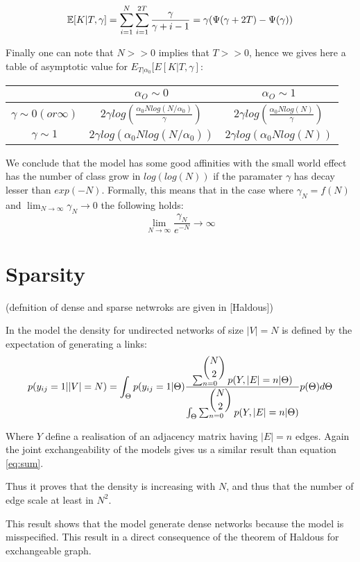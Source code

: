 \documentclass[a4paper, 12pt]{article}
\begin{document}
\begin{equation}
\mathbb{E}[K|T, \gamma] = \sum_{i=1}^N\sum_{i=1}^{2T} \frac{\gamma}{\gamma +i-1} = \gamma (\Psi(\gamma+2T) - \Psi(\gamma))
\end{equation}

Finally one can note that $N >> 0$ implies that $T>>0$, hence we gives here a table of asymptotic value for $E_{T|\alpha_0}[E[K|T, \gamma]$:

	\begin{tabular}{c|cc}
		 & $\alpha_O \sim 0$&$\alpha_O \sim 1$ \\
		\hline
		$\gamma \sim 0 (or \infty)$ & $2\gamma log(\frac{\alpha_0Nlog(N/\alpha_0)}{\gamma})$ & $2\gamma log(\frac{\alpha_0Nlog(N)}{\gamma})$ \\
		$\gamma \sim 1$ & $2\gamma log(\alpha_0Nlog(N/\alpha_0))$ &  $2\gamma log(\alpha_0Nlog(N))$
	\end{tabular}

We conclude that the model has some good affinities with the small world effect has the number of class grow in $log(log(N))$ if the paramater $\gamma$ has decay lesser than $exp(-N)$. Formally, this means that in the case where  $\gamma_N = f(N)$ and $\lim_{N\to\infty}\gamma_N \to 0$ the following holds:
$$\lim_{N\to\infty} \frac{\gamma_N}{e^{-N}} \to \infty$$


\section{Sparsity}
(defnition of dense and sparse netwroks are given in [Haldous])


In the model the density for undirected networks of size $|V|=N$ is defined by the expectation of generating a links:
\begin{equation}
p(y_{ij}=1| |V|=N) =  \int_{\Theta} p(y_{ij}=1|\Theta) \frac{\sum_{n=0}^{\dbinom{N}{2}} p(Y,|E|=n | \Theta)}{\int_{\Theta}\sum_{n=0}^{\dbinom{N}{2}}p(Y,|E|=n | \Theta)} p(\Theta) d\Theta
\end{equation}

Where $Y$ define a realisation of an adjacency matrix having $|E|=n$ edges. Again the joint exchangeability of the models gives us a similar result than equation \eqref{eq:sum}.

Thus it proves that the density is increasing with $N$, and thus that the number of edge scale at least in $N^2$. 

This result shows that the model generate dense networks because the model is misspecified. This result in a direct consequence of the theorem of Haldous for exchangeable graph.
\end{document}
